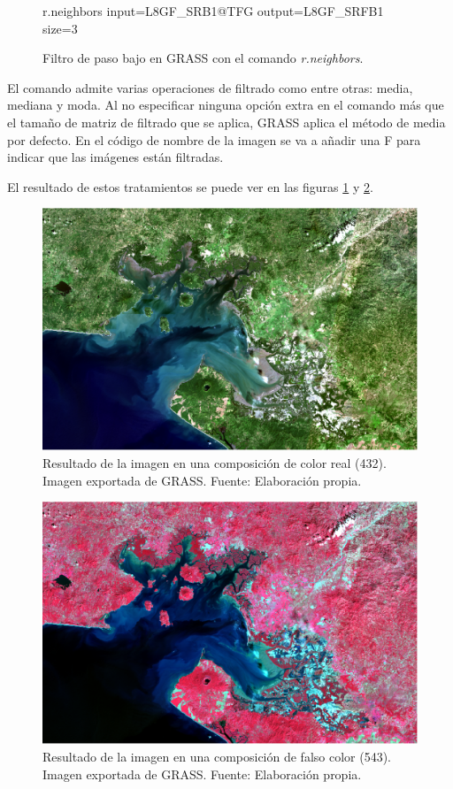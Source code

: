 \begin{figure}[h]
\centering
\begin{boxedverbatim}
	r.neighbors input=L8GF_SRB1@TFG output=L8GF_SRFB1 size=3
\end{boxedverbatim}
\caption[Filtro de paso bajo]{Filtro de paso bajo en GRASS con el comando \textit{r.neighbors}.}
\end{figure}

El comando admite varias operaciones de filtrado como entre otras: media, mediana y moda. Al no especificar ninguna opción extra en el comando más que el tamaño de matriz de filtrado que se aplica, GRASS aplica el método de media por defecto. En el código de nombre de la imagen se va a añadir una F para indicar que las imágenes están filtradas.

El resultado de estos tratamientos se puede ver en las figuras \ref{fig:gf432} y \ref{fig:gf543}.
\begin{figure}
	\centering
	\includegraphics[width=0.8\linewidth]{./Imagenes/GF432.eps}
	\caption[Composición en color real]{Resultado de la imagen en una composición de color real (432). Imagen exportada de GRASS. Fuente: Elaboración propia.}
	\label{fig:gf432}
\end{figure}

\begin{figure}
	\centering
	\includegraphics[width=0.8\linewidth]{./Imagenes/GF543.eps}
	\caption[Composición en falso color]{Resultado de la imagen en una composición de falso color (543). Imagen exportada de GRASS. Fuente: Elaboración propia.}
	\label{fig:gf543}
\end{figure}